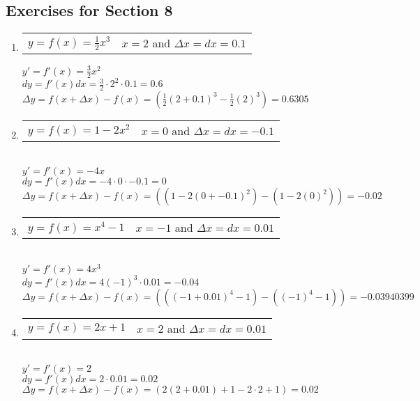 \documentclass[]{book}
\begin{document}
\subsection*{Exercises for Section 8}
    \begin{enumerate}[start = 7,itemsep=2\baselineskip]
        \item {\begin{tabular}[t]{@{}p{.5\linewidth}l}
        $y = f(x)=\frac{1}{2}x^3$ & $x=2$ and $\Delta{x}= dx = 0.1$
        \end{tabular}
        $y' = f'(x)=\frac{3}{2}x^2$\\
        $dy = f'(x)dx = \frac{3}{2} \cdot 2^2 \cdot 0.1 = 0.6$\\
        $\Delta{y} = f(x+\Delta{x}) - f(x)= \left(\frac{1}{2}(2+0.1)^3 - \frac{1}{2}(2)^3 \right) = 0.6305$}

        \item {\begin{tabular}[t]{@{}p{.5\linewidth}l}
        $y = f(x)=1-2x^2$ & $x=0$ and $\Delta{x}= dx = -0.1$
        \end{tabular}\\
        $y' = f'(x)=-4x $\\
        $dy = f'(x)dx = -4 \cdot 0 \cdot -0.1 = 0$\\
        $\Delta{y} = f(x+\Delta{x}) - f(x)= \left((1-2(0+-0.1)^2) - (1-2(0)^2)\right) = -0.02$}

        \item {\begin{tabular}[t]{@{}p{.5\linewidth}l}
        $y = f(x)=x^4-1$ & $x=-1$ and $\Delta{x} = dx = 0.01$
        \end{tabular}\\
        $y' = f'(x)=4x^3 $\\
        $dy = f'(x)dx = 4(-1)^3 \cdot 0.01 = -0.04$\\
        $\Delta{y} = f(x+\Delta{x}) - f(x)= \left(((-1+0.01)^4 - 1) - ((-1)^4 - 1)\right) = -0.03940399$}

        \item {\begin{tabular}[t]{@{}p{.5\linewidth}l}
        $y = f(x)=2x+1$ & $x=2$ and $\Delta{x} = dx = 0.01$
        \end{tabular}\\
        $y' = f'(x)= 2 $\\
        $dy = f'(x)dx = 2 \cdot 0.01 = 0.02$\\
        $\Delta{y} = f(x+\Delta{x}) - f(x)= \left( 2(2+0.01)+1 - 2\cdot2+1 \right) = 0.02$}
    \end{enumerate}
\end{document}

